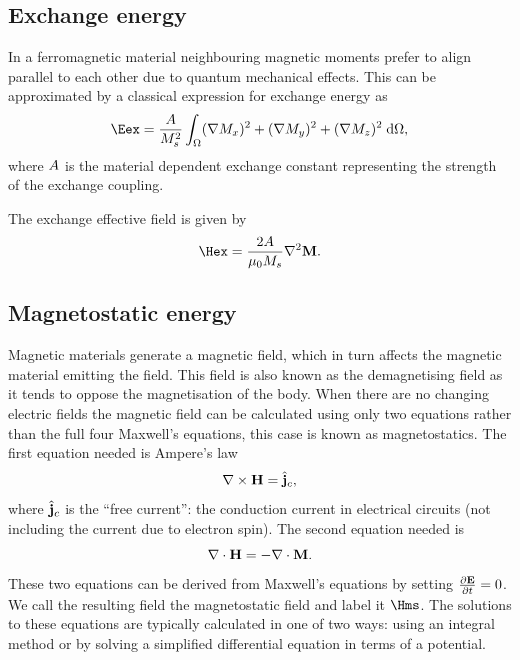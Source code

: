 \subsection{Exchange energy}

In a ferromagnetic material neighbouring magnetic moments prefer to align parallel to each other due to quantum mechanical effects.
This can be approximated by a classical expression for exchange energy \cite{Aharoni1996} as
\begin{equation}
  \label{eq:39}
  \Eex =  \frac{\Exchc}{M_s^2} \int_{\magd} (\nabla M_x)^2  + (\nabla M_y)^2  + (\nabla M_z)^2 \d \magd,
\end{equation}
where $A$ is the material dependent exchange constant representing the strength of the exchange coupling.


The exchange effective field is given by
\begin{equation}
  \label{eq:Hex}
  \Hex = \frac{2 \Exchc}{ \mu_0 M_s} \lap \Mv.
\end{equation}


\subsection{Magnetostatic energy}
\label{sec:magnetostatic-field}

Magnetic materials generate a magnetic field, which in turn affects the magnetic material emitting the field.
This field is also known as the demagnetising field as it tends to oppose the magnetisation of the body.
When there are no changing electric fields the magnetic field can be calculated using only two equations rather than the full four Maxwell's equations, this case is known as magnetostatics.
The first equation needed is Ampere's law \cite[33]{Coey2010}
\begin{equation}
  \nabla \times \boldsymbol{\mathrm{H}} = {\hat{\mathbf{j}}}_c,
\end{equation}
where ${\hat{\mathbf{j}}}_c$ is the ``free current'': the conduction current in electrical circuits (\ie not including the current due to electron spin).
The second equation needed is \cite[34]{Coey2010}
\begin{equation}
  \nabla \cdot \boldsymbol{\mathrm{H}} = - \nabla \cdot \boldsymbol{\mathrm{M}}.
\end{equation}
These two equations can be derived from Maxwell's equations by setting $\frac{\partial \mathbf{E}}{\partial t} = 0$.
We call the resulting field the magnetostatic field and label it $\Hms$.
The solutions to these equations are typically calculated in one of two ways: using an integral method or by solving a simplified differential equation in terms of a potential.

